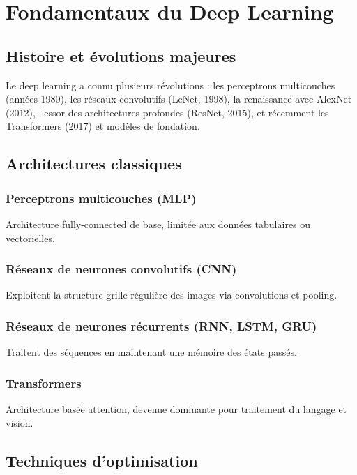 
\chapter{Fondamentaux du Deep Learning}

\section{Histoire et évolutions majeures}

Le deep learning a connu plusieurs révolutions : les perceptrons multicouches (années 1980), les réseaux convolutifs (LeNet, 1998), la renaissance avec AlexNet (2012), l'essor des architectures profondes (ResNet, 2015), et récemment les Transformers (2017) et modèles de fondation.

\section{Architectures classiques}

\subsection{Perceptrons multicouches (MLP)}
Architecture fully-connected de base, limitée aux données tabulaires ou vectorielles.

\subsection{Réseaux de neurones convolutifs (CNN)}
Exploitent la structure grille régulière des images via convolutions et pooling.

\subsection{Réseaux de neurones récurrents (RNN, LSTM, GRU)}
Traitent des séquences en maintenant une mémoire des états passés.

\subsection{Transformers}
Architecture basée attention, devenue dominante pour traitement du langage et vision.

\section{Techniques d'optimisation}

